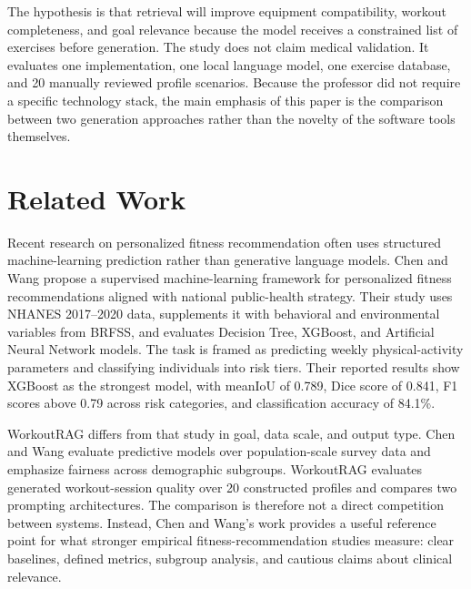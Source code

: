 \documentclass[12pt]{article}
\begin{document}
The hypothesis is that retrieval will improve equipment compatibility, workout completeness, and goal relevance because the model receives a constrained list of exercises before generation. The study does not claim medical validation. It evaluates one implementation, one local language model, one exercise database, and 20 manually reviewed profile scenarios. Because the professor did not require a specific technology stack, the main emphasis of this paper is the comparison between two generation approaches rather than the novelty of the software tools themselves.

\section{Related Work}
Recent research on personalized fitness recommendation often uses structured machine-learning prediction rather than generative language models. Chen and Wang \cite{chen2025personalized} propose a supervised machine-learning framework for personalized fitness recommendations aligned with national public-health strategy. Their study uses NHANES 2017--2020 data, supplements it with behavioral and environmental variables from BRFSS, and evaluates Decision Tree, XGBoost, and Artificial Neural Network models. The task is framed as predicting weekly physical-activity parameters and classifying individuals into risk tiers. Their reported results show XGBoost as the strongest model, with meanIoU of 0.789, Dice score of 0.841, F1 scores above 0.79 across risk categories, and classification accuracy of 84.1\%.

WorkoutRAG differs from that study in goal, data scale, and output type. Chen and Wang evaluate predictive models over population-scale survey data and emphasize fairness across demographic subgroups. WorkoutRAG evaluates generated workout-session quality over 20 constructed profiles and compares two prompting architectures. The comparison is therefore not a direct competition between systems. Instead, Chen and Wang's work provides a useful reference point for what stronger empirical fitness-recommendation studies measure: clear baselines, defined metrics, subgroup analysis, and cautious claims about clinical relevance.
\end{document}
